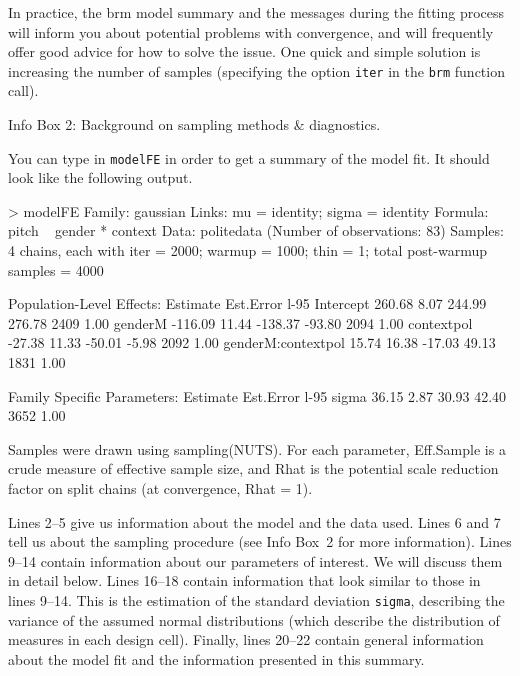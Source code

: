 \documentclass[nobib]{tufte-handout}
\begin{document}
\begin{InfoBox}[]
{\begin{minipage}{1\textwidth}
    \medskip
  
    In practice, the \textrm{brm} model summary and the messages during the fitting process will inform you about potential problems with convergence, and will frequently offer good advice for how to solve the issue. One quick and simple solution is increasing the number of samples (specifying the option \texttt{iter} in the \texttt{brm} function call).
   
  \end{minipage} \par
  } \par
  \begin{center}
    Info Box 2: Background on sampling methods \& diagnostics.
  \end{center}
\end{InfoBox}


You can type in \texttt{modelFE} in order to get a summary of the model fit. It should look like the following output.

\bigskip

\begin{minipage}[]{1.2\textwidth}
\begin{rc}
> modelFE
 Family: gaussian 
  Links: mu = identity; sigma = identity 
Formula: pitch ~ gender * context 
   Data: politedata (Number of observations: 83) 
Samples: 4 chains, each with iter = 2000; warmup = 1000; thin = 1;
         total post-warmup samples = 4000

Population-Level Effects: 
                   Estimate Est.Error l-95%
Intercept            260.68      8.07   244.99   276.78       2409 1.00
genderM             -116.09     11.44  -138.37   -93.80       2094 1.00
contextpol           -27.38     11.33   -50.01    -5.98       2092 1.00
genderM:contextpol    15.74     16.38   -17.03    49.13       1831 1.00

Family Specific Parameters: 
      Estimate Est.Error l-95%
sigma    36.15      2.87    30.93    42.40       3652 1.00

Samples were drawn using sampling(NUTS). For each parameter, Eff.Sample 
is a crude measure of effective sample size, and Rhat is the potential 
scale reduction factor on split chains (at convergence, Rhat = 1).
\end{rc}
\end{minipage}

Lines 2--5 give us information about the model and the data used. Lines 6 and 7 tell us about
the sampling procedure (see Info Box~2 for more information). Lines 9--14 contain information about our
parameters of interest. We will discuss them in detail below. Lines 16--18 contain information
that look similar to those in lines 9--14. This is the estimation of the standard deviation
\texttt{sigma}, describing the variance of the assumed normal distributions (which describe the
distribution of measures in each design cell). Finally, lines 20--22 contain general
information about the model fit and the information presented in this summary.
\end{document}

